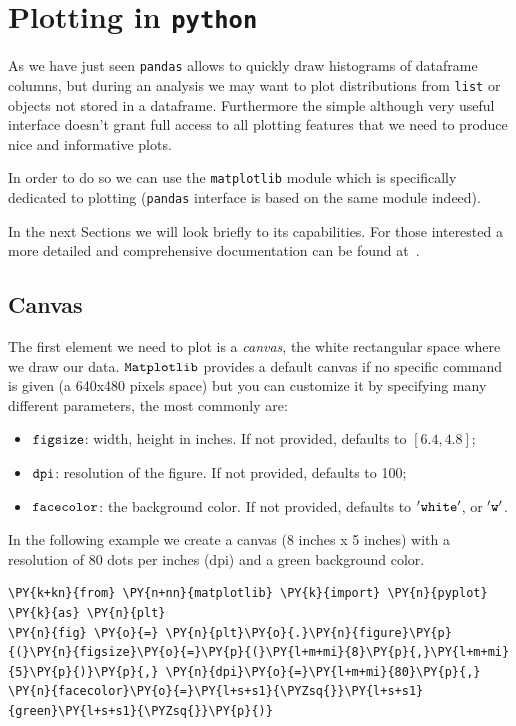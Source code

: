 \section{Plotting in \texttt{python}}\label{plotting-in-python}

As we have just seen \texttt{pandas} allows to quickly draw histograms of dataframe columns, but during an analysis we may want to plot distributions from \texttt{list} or objects not stored in a dataframe. Furthermore the simple although very useful interface doesn't grant full access to all plotting features that we need to produce nice and informative plots.

In order to do so we can use the \texttt{matplotlib} module which is specifically dedicated to plotting (\texttt{pandas} interface is based on the same module indeed). 

In the next Sections we will look briefly to its capabilities. For those interested a more detailed and comprehensive documentation can be found at~\cite{matplotlib}.

\subsection{Canvas}\label{canvas}

The first element we need to plot is a \emph{canvas}, the white
rectangular space where we draw our data. \(\tt{Matplotlib}\) provides a
default canvas if no specific command is given (a 640x480 pixels space)
but you can customize it by specifying many different parameters, the
most commonly are:

\begin{itemize}
	\tightlist
	\item
	\(\tt{figsize}\): width, height in inches. If not provided, defaults
	to \([6.4, 4.8]\);
	\item
	\(\tt{dpi}\): resolution of the figure. If not provided, defaults to
	100;
	\item
	\(\tt{facecolor}\): the background color. If not provided, defaults to
	\(\tt{'white'}\), or \(\tt{'w'}\).
\end{itemize}

In the following example we create a canvas (8 inches x 5 inches) with a
resolution of 80 dots per inches (dpi) and a green background color.

\begin{tcolorbox}[breakable, size=fbox, boxrule=1pt, pad at break*=1mm,colback=cellbackground, colframe=cellborder]
\begin{Verbatim}[commandchars=\\\{\}]
\PY{k+kn}{from} \PY{n+nn}{matplotlib} \PY{k}{import} \PY{n}{pyplot} \PY{k}{as} \PY{n}{plt}
\PY{n}{fig} \PY{o}{=} \PY{n}{plt}\PY{o}{.}\PY{n}{figure}\PY{p}{(}\PY{n}{figsize}\PY{o}{=}\PY{p}{(}\PY{l+m+mi}{8}\PY{p}{,}\PY{l+m+mi}{5}\PY{p}{)}\PY{p}{,} \PY{n}{dpi}\PY{o}{=}\PY{l+m+mi}{80}\PY{p}{,} \PY{n}{facecolor}\PY{o}{=}\PY{l+s+s1}{\PYZsq{}}\PY{l+s+s1}{green}\PY{l+s+s1}{\PYZsq{}}\PY{p}{)}
\end{Verbatim}
\end{tcolorbox}

